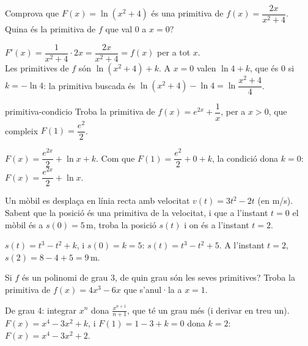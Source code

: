 \begin{apartats}

Comprova que $F(x)=\ln(x^2+4)$ és una primitiva de $f(x)=\dfrac{2x}{x^2+4}$. Quina és la primitiva
de $f$ que val 0 a $x=0$?

\begin{solucio}
$F'(x)=\dfrac{1}{x^2+4}\cdot2x=\dfrac{2x}{x^2+4}=f(x)$ per a tot $x$.\\
Les primitives de $f$ són $\ln(x^2+4)+k$. A $x=0$ valen $\ln4+k$, que és 0 si $k=-\ln4$: la primitiva
buscada és $\ln(x^2+4)-\ln4=\ln\dfrac{x^2+4}{4}$.
\end{solucio}

\begin{tria}{primitiva-condicio}
Troba la primitiva de $f(x)=e^{2x}+\dfrac1x$, per a $x>0$, que compleix $F(1)=\dfrac{e^2}{2}$.

\begin{solucio}
$F(x)=\dfrac{e^{2x}}{2}+\ln x+k$. Com que $F(1)=\dfrac{e^2}{2}+0+k$, la condició dona $k=0$:
$F(x)=\dfrac{e^{2x}}{2}+\ln x$.
\end{solucio}

Un mòbil es desplaça en línia recta amb velocitat $v(t)=3t^2-2t$ (en m/s). Sabent que la posició és una
primitiva de la velocitat, i que a l'instant $t=0$ el mòbil és a $s(0)=5$\,m, troba la posició $s(t)$ i
on és a l'instant $t=2$.

\begin{solucio}
$s(t)=t^3-t^2+k$, i $s(0)=k=5$: $s(t)=t^3-t^2+5$. A l'instant $t=2$, $s(2)=8-4+5=9$\,m.
\end{solucio}
\end{tria}

\begin{nomesllarg}
Si $f$ és un polinomi de grau 3, de quin grau són les seves primitives? Troba la primitiva de
$f(x)=4x^3-6x$ que s'anul·la a $x=1$.

\begin{solucio}
De grau 4: integrar $x^n$ dona $\frac{x^{n+1}}{n+1}$, que té un grau més (i derivar en treu un).\\
$F(x)=x^4-3x^2+k$, i $F(1)=1-3+k=0$ dona $k=2$: $F(x)=x^4-3x^2+2$.
\end{solucio}
\end{nomesllarg}

\end{apartats}
